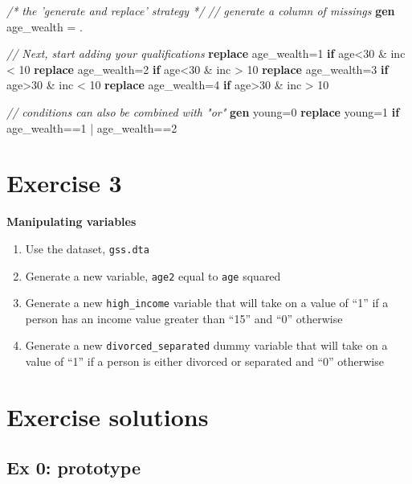 \documentclass[]{book}
\newenvironment{Shaded}{\begin{snugshade}}{\end{snugshade}}
\newcommand{\CommentTok}[1]{\textcolor[rgb]{0.56,0.35,0.01}{\textit{#1}}}
\newcommand{\KeywordTok}[1]{\textcolor[rgb]{0.13,0.29,0.53}{\textbf{#1}}}
\newcommand{\NormalTok}[1]{#1}
\providecommand{\tightlist}{%
  \setlength{\itemsep}{0pt}\setlength{\parskip}{0pt}}
\begin{document}
\begin{Shaded}
\begin{Highlighting}[]
  \CommentTok{/* the 'generate and replace' strategy */} 
  \CommentTok{// generate a column of missings}
  \KeywordTok{gen}\NormalTok{ age_wealth = .}

  \CommentTok{// Next, start adding your qualifications}
  \KeywordTok{replace}\NormalTok{ age_wealth=1 }\KeywordTok{if}\NormalTok{ age<30 & inc < 10}
  \KeywordTok{replace}\NormalTok{ age_wealth=2 }\KeywordTok{if}\NormalTok{ age<30 & inc > 10}
  \KeywordTok{replace}\NormalTok{ age_wealth=3 }\KeywordTok{if}\NormalTok{ age>30 & inc < 10}
  \KeywordTok{replace}\NormalTok{ age_wealth=4 }\KeywordTok{if}\NormalTok{ age>30 & inc > 10}

  \CommentTok{// conditions can also be combined with "or"}
  \KeywordTok{gen}\NormalTok{ young=0}
  \KeywordTok{replace}\NormalTok{ young=1 }\KeywordTok{if}\NormalTok{ age_wealth==1 | age_wealth==2}
\end{Highlighting}
\end{Shaded}

\hypertarget{exercise-3-4}{%
\section{Exercise 3}\label{exercise-3-4}}

\textbf{Manipulating variables}

\begin{enumerate}
\def\labelenumi{\arabic{enumi}.}
\tightlist
\item
  Use the dataset, \texttt{gss.dta}
\item
  Generate a new variable, \texttt{age2} equal to \texttt{age} squared
\item
  Generate a new \texttt{high\_income} variable that will take on a value of ``1'' if a person has an income value greater than ``15'' and ``0'' otherwise
\item
  Generate a new \texttt{divorced\_separated} dummy variable that will take on a value of ``1'' if a person is either divorced or separated and ``0'' otherwise
\end{enumerate}

\hypertarget{exercise-solutions-6}{%
\section{Exercise solutions}\label{exercise-solutions-6}}

\hypertarget{ex-0-prototype-6}{%
\subsection{Ex 0: prototype}\label{ex-0-prototype-6}}
\end{document}
